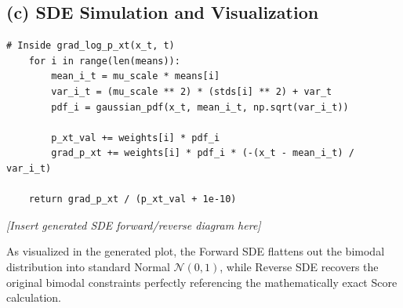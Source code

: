 \documentclass[11pt]{article}
\begin{document}
\subsection*{(c) SDE Simulation and Visualization}
\begin{lstlisting}[caption={Analytical Score matching code}]
    # Inside grad_log_p_xt(x_t, t)
    for i in range(len(means)):
        mean_i_t = mu_scale * means[i]
        var_i_t = (mu_scale ** 2) * (stds[i] ** 2) + var_t
        pdf_i = gaussian_pdf(x_t, mean_i_t, np.sqrt(var_i_t))
        
        p_xt_val += weights[i] * pdf_i
        grad_p_xt += weights[i] * pdf_i * (-(x_t - mean_i_t) / var_i_t)
        
    return grad_p_xt / (p_xt_val + 1e-10)
\end{lstlisting}

\vspace{0.5cm}
\centerline{\textit{[Insert generated SDE forward/reverse diagram here]}}
\vspace{0.5cm}
As visualized in the generated plot, the Forward SDE flattens out the bimodal distribution into standard Normal $\mathcal{N}(0, 1)$, while Reverse SDE recovers the original bimodal constraints perfectly referencing the mathematically exact Score calculation.
\end{document}
